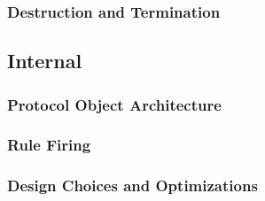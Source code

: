 \subsubsection{Destruction and Termination}
\subsection{Internal}
\subsubsection{Protocol Object Architecture}
\subsubsection{Rule Firing}
\subsubsection{Design Choices and Optimizations}